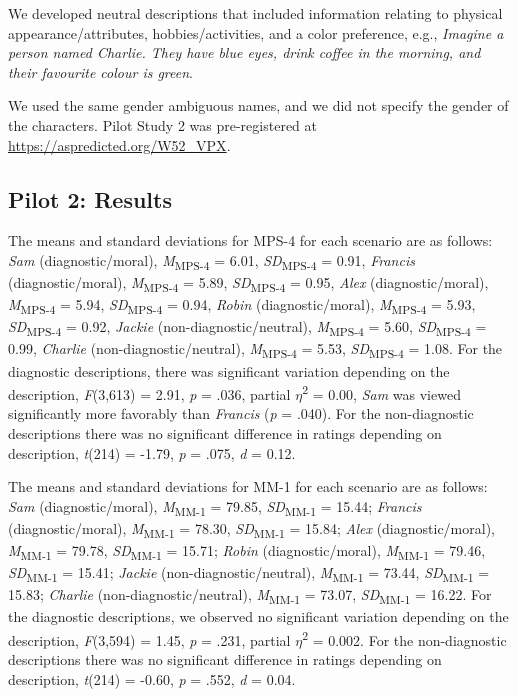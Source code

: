 \documentclass[
  english,
  man,floatsintext]{apa7}
\begin{document}
We developed neutral descriptions that included information relating to physical appearance/attributes, hobbies/activities, and a color preference, e.g., \emph{Imagine a person named Charlie. They have blue eyes, drink coffee in the morning, and their favourite colour is green}.

We used the same gender ambiguous names, and we did not specify the gender of the characters. Pilot Study 2 was pre-registered at \color{blue}\url{https://aspredicted.org/W52_VPX}\color{black}.

\hypertarget{pilot-2-results}{%
\subsection{Pilot 2: Results}\label{pilot-2-results}}

The means and standard deviations for MPS-4 for each scenario are as follows:
\emph{Sam} (diagnostic/moral),
\emph{M}\textsubscript{MPS-4} = 6.01, \emph{SD}\textsubscript{MPS-4} = 0.91,
\emph{Francis} (diagnostic/moral),
\emph{M}\textsubscript{MPS-4} = 5.89, \emph{SD}\textsubscript{MPS-4} = 0.95,
\emph{Alex} (diagnostic/moral),
\emph{M}\textsubscript{MPS-4} = 5.94, \emph{SD}\textsubscript{MPS-4} = 0.94,
\emph{Robin} (diagnostic/moral),
\emph{M}\textsubscript{MPS-4} = 5.93, \emph{SD}\textsubscript{MPS-4} = 0.92,
\emph{Jackie} (non-diagnostic/neutral),
\emph{M}\textsubscript{MPS-4} = 5.60, \emph{SD}\textsubscript{MPS-4} = 0.99,
\emph{Charlie} (non-diagnostic/neutral),
\emph{M}\textsubscript{MPS-4} = 5.53, \emph{SD}\textsubscript{MPS-4} = 1.08. For the diagnostic descriptions, there was significant variation depending on the description, \emph{F}(3,613) = 2.91, \emph{p} = .036, partial \(\eta\)\textsuperscript{2} = 0.00, \emph{Sam} was viewed significantly more favorably than \emph{Francis} (\emph{p} = .040). For the non-diagnostic descriptions there was no significant difference in ratings depending on description, \emph{t}(214) = -1.79, \emph{p} = .075, \emph{d} = 0.12.

The means and standard deviations for MM-1 for each scenario are as follows:
\emph{Sam} (diagnostic/moral),
\emph{M}\textsubscript{MM-1} = 79.85, \emph{SD}\textsubscript{MM-1} = 15.44;
\emph{Francis} (diagnostic/moral),
\emph{M}\textsubscript{MM-1} = 78.30, \emph{SD}\textsubscript{MM-1} = 15.84;
\emph{Alex} (diagnostic/moral),
\emph{M}\textsubscript{MM-1} = 79.78, \emph{SD}\textsubscript{MM-1} = 15.71;
\emph{Robin} (diagnostic/moral),
\emph{M}\textsubscript{MM-1} = 79.46, \emph{SD}\textsubscript{MM-1} = 15.41;
\emph{Jackie} (non-diagnostic/neutral),
\emph{M}\textsubscript{MM-1} = 73.44, \emph{SD}\textsubscript{MM-1} = 15.83;
\emph{Charlie} (non-diagnostic/neutral),
\emph{M}\textsubscript{MM-1} = 73.07, \emph{SD}\textsubscript{MM-1} = 16.22. For the diagnostic descriptions, we observed no significant variation depending on the description, \emph{F}(3,594) = 1.45, \emph{p} = .231, partial \(\eta\)\textsuperscript{2} = 0.002. For the non-diagnostic descriptions there was no significant difference in ratings depending on description, \emph{t}(214) = -0.60, \emph{p} = .552, \emph{d} = 0.04.
\end{document}
